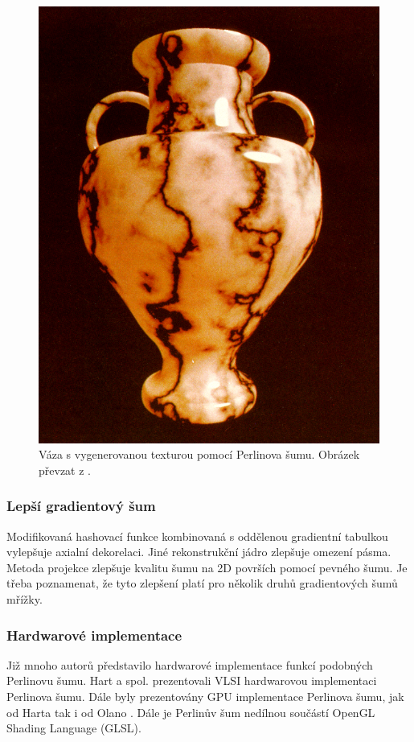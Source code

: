 \begin{figure}[H]
	\centering
	\includegraphics[scale=0.3]{obrazky-figures/PerlinNoiseVase.png}
	\caption{Váza s vygenerovanou texturou pomocí Perlinova šumu. Obrázek převzat z \cite{PerlinKen}.}
	\label{PerlinVase}
\end{figure}

\subsubsection{Lepší gradientový šum}
Modifikovaná hashovací funkce kombinovaná s oddělenou gradientní tabulkou vylepšuje axialní dekorelaci. Jiné rekonstrukční jádro zlepšuje omezení pásma. Metoda projekce zlepšuje kvalitu šumu na 2D površích pomocí pevného šumu. Je třeba poznamenat, že tyto zlepšení platí pro několik druhů gradientových šumů mřížky. \cite{Kensler2008}

\subsubsection{Hardwarové implementace}
Již mnoho autorů představilo hardwarové implementace funkcí podobných Perlinovu šumu. Hart a spol. \cite{hart1999antialiased} prezentovali VLSI hardwarovou implementaci Perlinova šumu. Dále byly prezentovány GPU implementace Perlinova šumu, jak od Harta \cite{hart01} tak i od Olano \cite{ola05}. Dále je Perlinův šum nedílnou součástí OpenGL Shading Language (GLSL).


